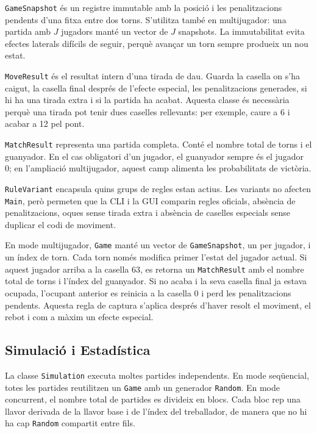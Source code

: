 \documentclass[conference,compsoc]{IEEEtran}
\begin{document}
\texttt{GameSnapshot} és un registre immutable amb la posició i les penalitzacions
pendents d'una fitxa entre dos torns. S'utilitza també en multijugador: una partida
amb $J$ jugadors manté un vector de $J$ snapshots. La immutabilitat evita efectes
laterals difícils de seguir, perquè avançar un torn sempre produeix un nou estat.

\texttt{MoveResult} és el resultat intern d'una tirada de dau. Guarda la casella on
s'ha caigut, la casella final després de l'efecte especial, les penalitzacions
generades, si hi ha una tirada extra i si la partida ha acabat. Aquesta classe és
necessària perquè una tirada pot tenir dues caselles rellevants: per exemple, caure
a 6 i acabar a 12 pel pont.

\texttt{MatchResult} representa una partida completa. Conté el nombre total de torns
i el guanyador. En el cas obligatori d'un jugador, el guanyador sempre és el jugador
0; en l'ampliació multijugador, aquest camp alimenta les probabilitats de victòria.

\texttt{RuleVariant} encapsula quins grups de regles estan actius. Les variants no
afecten \texttt{Main}, però permeten que la CLI i la GUI comparin regles oficials,
absència de penalitzacions, oques sense tirada extra i absència de caselles
especials sense duplicar el codi de moviment.

En mode multijugador, \texttt{Game} manté un vector de \texttt{GameSnapshot}, un per
jugador, i un índex de torn. Cada torn només modifica primer l'estat del jugador
actual. Si aquest jugador arriba a la casella 63, es retorna un \texttt{MatchResult}
amb el nombre total de torns i l'índex del guanyador. Si no acaba i la seva casella
final ja estava ocupada, l'ocupant anterior es reinicia a la casella 0 i perd les
penalitzacions pendents. Aquesta regla de captura s'aplica després d'haver resolt el
moviment, el rebot i com a màxim un efecte especial.

\subsection{Simulació i Estadística}

La classe \texttt{Simulation} executa moltes partides independents. En mode
seqüencial, totes les partides reutilitzen un \texttt{Game} amb un generador
\texttt{Random}. En mode concurrent, el nombre total de partides es divideix en
blocs. Cada bloc rep una llavor derivada de la llavor base i de l'índex del
treballador, de manera que no hi ha cap \texttt{Random} compartit entre fils.
\end{document}
